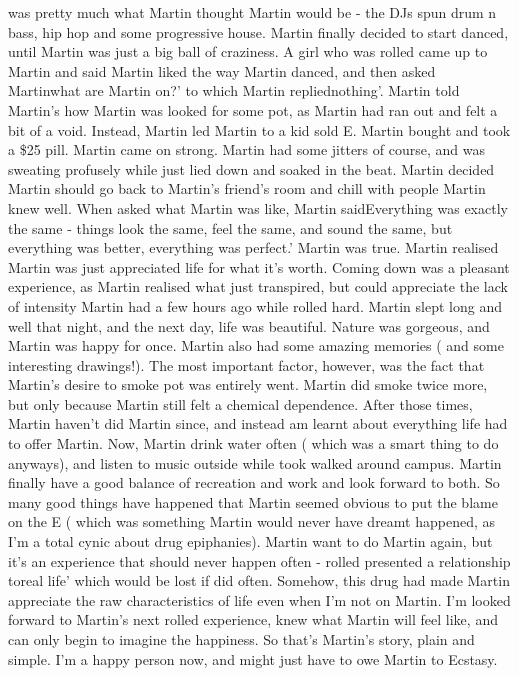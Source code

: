 \documentclass[12pt]{book}
\begin{document}
was pretty much what Martin thought Martin would be - the DJs spun drum n bass, hip hop and some progressive house. Martin finally decided to start danced, until Martin was just a big ball of craziness. A girl who was rolled came up to Martin and said Martin liked the way Martin danced, and then asked Martinwhat are Martin on?' to which Martin repliednothing'. Martin told Martin's how Martin was looked for some pot, as Martin had ran out and felt a bit of a void. Instead, Martin led Martin to a kid sold E. Martin bought and took a \$25 pill. Martin came on strong. Martin had some jitters of course, and was sweating profusely while just lied down and soaked in the beat. Martin decided Martin should go back to Martin's friend's room and chill with people Martin knew well. When asked what Martin was like, Martin saidEverything was exactly the same - things look the same, feel the same, and sound the same, but everything was better, everything was perfect.' Martin was true. Martin realised Martin was just appreciated life for what it's worth. Coming down was a pleasant experience, as Martin realised what just transpired, but could appreciate the lack of intensity Martin had a few hours ago while rolled hard. Martin slept long and well that night, and the next day, life was beautiful. Nature was gorgeous, and Martin was happy for once. Martin also had some amazing memories ( and some interesting drawings!). The most important factor, however, was the fact that Martin's desire to smoke pot was entirely went. Martin did smoke twice more, but only because Martin still felt a chemical dependence. After those times, Martin haven't did Martin since, and instead am learnt about everything life had to offer Martin. Now, Martin drink water often ( which was a smart thing to do anyways), and listen to music outside while took walked around campus. Martin finally have a good balance of recreation and work and look forward to both. So many good things have happened that Martin seemed obvious to put the blame on the E ( which was something Martin would never have dreamt happened, as I'm a total cynic about drug epiphanies). Martin want to do Martin again, but it's an experience that should never happen often - rolled presented a relationship toreal life' which would be lost if did often. Somehow, this drug had made Martin appreciate the raw characteristics of life even when I'm not on Martin. I'm looked forward to Martin's next rolled experience, knew what Martin will feel like, and can only begin to imagine the happiness. So that's Martin's story, plain and simple. I'm a happy person now, and might just have to owe Martin to Ecstasy.
\end{document}
